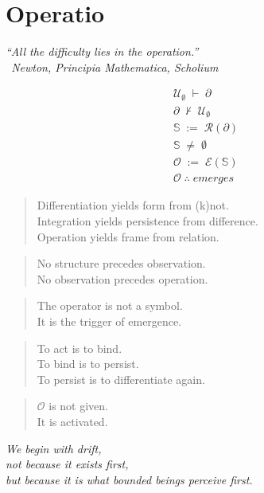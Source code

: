 \chapter*{Operatio}
\label{sec:bk1_operatio}
\begin{flushright}
\emph{``All the difficulty lies in the operation.''}\\
\emph{\textendash\ Newton, \textit{Principia Mathematica}, Scholium}
\end{flushright}
\vspace{1em}
\begin{center}
\Large
\renewcommand{\arraystretch}{1.35}
\[
\begin{array}{l}
\mathcal{U}_{\emptyset} \;\vdash\; \partial \\
\partial \;\nvdash\; \mathcal{U}_{\emptyset} \\
\mathbb{S} \;:=\; \mathcal{R}(\partial) \\
\mathbb{S} \;\neq\; \emptyset \\
\mathcal{O} \;:=\; \mathcal{E}(\mathbb{S}) \\
\mathcal{O} \;\therefore\; \textit{emerges}
\end{array}
\]
\end{center}
\vspace{1em}
\begin{quote}
Differentiation yields form from (k)not.\\
Integration yields persistence from difference.\\
Operation yields frame from relation.
\end{quote}
\begin{quote}
No structure precedes observation.\\
No observation precedes operation.
\end{quote}
\begin{quote}
The operator is not a symbol.\\
It is the trigger of emergence.
\end{quote}
\begin{quote}
To act is to bind.\\
To bind is to persist.\\
To persist is to differentiate again.
\end{quote}
\begin{quote}
$\mathcal{O}$ is not given.\\
It is activated.
\end{quote}
\begin{center}
\emph{We begin with drift,\\
not because it exists first,\\
but because it is what bounded beings perceive first.}
\end{center}
